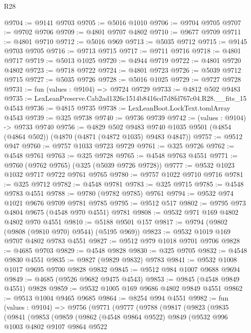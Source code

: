 \begin{lexlean}{R28}
\begin{coremodule}
@9704 := @9141 @9703
@9705 := @5016 @1010
@9706 := @9704 @9705
@9707 := @9702 @9706
@9709 := @4801 @9707 @4802
@9710 := @9677 @9709
@9711 := @4801 @9710
@9712 := @5016 @969
@9713 := @5035 @9712
@9715 := @9145 @9703 @9705
@9716 := @9713 @9715
@9717 := @9711 @9716
@9718 := @4801 @9717
@9719 := @5013 @1025
@9720 := @4944 @9719
@9722 := @4801 @9720 @4802
@9723 := @9718 @9722
@9724 := @4801 @9723
@9726 := @5039 @9712 @9715
@9727 := @5035 @9726
@9728 := @5016 @1025
@9729 := @9727 @9728
@9731 := fun (values : @9104) => @9724 @9729
@9733 := @4812 @502 @9483
@9735 := LexLeanPreserve.Cab2ad1326c1514b8416cd7d8fd767c04.R28.__fits_15 @4543
@9736 := @4815 @9735
@9738 := LexLeanBoot.LockText.tomlArray @4543
@9739 := @325 @9738
@9740 := @9736 @9739
@9742 := (values : @9104) -> @9733 @9740
@9756 := @4829
    @502
    @9483
    @9740
    @1035
    @9501
    (@4854 (@4864 @502))
    (@4870 (@4871 (@4872 @1035) @9483 @4847))
@9757 := @9512 @947
@9760 := @9757 @1033 @9723 @9729
@9761 := @325 @9726
@9762 := @4548 @9761
@9763 := @325 @9728
@9765 := @4548 @9763 @4551
@9771 := @9760 (@9762 @9765) (@325 (@5039 @9726 @9728))
@9777 := @9532 @1023 @1032 @9717 @9722 @9761 @9765
@9780 := @9757 @1022 @9710 @9716
@9781 := @325 @9712
@9782 := @4548 @9781
@9783 := @325 @9715
@9785 := @4548 @9783 @4551
@9788 := @9780 (@9782 @9785) @9761
@9794 := @9532 @974 @1021 @9676 @9709 @9781 @9785
@9795 := @9512 @517
@9802 := @9795 @973 @4804 @9675 (@4548 @970 @4551) @9781
@9808 := @9532 @971 @169 @4802 @4802 @970 @4551
@9810 := @5188 @9501 @157
@9817 := @9794 (@9802 (@9808 (@9810 @970) @9544) (@5195 @969))
@9823 := @9532 @1019 @169 @9707 @4802 @9783 @4551
@9827 := @9512 @979 @1018 @9701 @9706
@9828 := @4685 @9703
@9829 := @4548 @9828
@9830 := @325 @9705
@9832 := @4548 @9830 @4551
@9835 := @9827 (@9829 @9832) @9783
@9841 := @9532 @1008 @1017 @9695 @9700 @9828 @9832
@9845 := @9512 @984 @1007 @9688 @9694
@9849 := @4685 (@9526 @9682 @9475 @4543)
@9853 := @9845 (@4548 @9849 @4551) @9828
@9859 := @9532 @1005 @169 @9686 @4802 @9849 @4551
@9862 := @9513 @1004 @9465 @9685
@9864 := @8254 @994 @4551
@9982 := fun (values : @9104) =>
  @9756
    (@9771
      (@9777
        (@9788
          (@9817
            (@9823
              (@9835
                (@9841
                  (@9853
                    (@9859
                      (@9862
                        (@4548 @9864 @9522)
                        @9849
                        (@9532
                          @996
                          @1003
                          @4802
                          @9107
                          @9864
                          @9522

\end{coremodule}
\end{lexlean}
